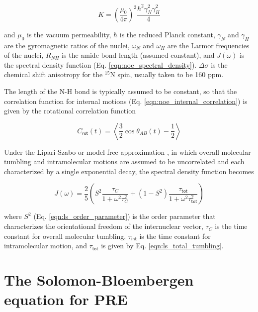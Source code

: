 \documentclass[9pt,review,pubversion]{livecoms}
\begin{document}
\begin{equation}
\label{eqn:spin_relaxation_constant}
K = \left( \frac {\mu_0} {4 \pi} \right)^2 \frac {\hbar^2 \gamma_N^2 \gamma_H^2} {4}
\end{equation}

\noindent and $\mu_0$ is the vacuum permeability, $\hbar$ is the reduced Planck constant, $\gamma_N$ and $\gamma_H$ are the gyromagnetic ratios of the nuclei, $\omega_N$ and $\omega_H$ are the Larmor frequencies of the nuclei, $R_{NH}$ is the amide bond length (assumed constant), and $J(\omega)$ is the spectral density function (Eq. \ref{eqn:noe_spectral_density}).
$\Delta \sigma$ is the chemical shift anisotropy for the $^{15}$N spin, usually taken to be 160 ppm.

The length of the N-H bond is typically assumed to be constant, so that the correlation function for internal motions (Eq. \ref{eqn:noe_internal_correlation}) is given by the rotational correlation function

\begin{equation}
\label{eqn:spin_relaxation_correlation_function}
C_{\mathsf{rot}}(t) = \left \langle \frac {3} {2} \cos \theta_{AB}(t) - \frac {1} {2} \right \rangle
\end{equation}

Under the Lipari-Szabo or model-free approximation \cite{lipari_model-free_1982}, in which overall molecular tumbling and intramolecular motions are assumed to be uncorrelated and each characterized by a single exponential decay, the spectral density function becomes

\begin{equation}
\label{eqn:spin_relaxation_spectral_density}
J(\omega) = \frac {2} {5} \left( S^2 \frac {\tau_C} {1 + \omega^2 \tau_C^2} + \left( 1 - S^2 \right) \frac {\tau_{\mathsf{tot}}} {1 + \omega^2 \tau_{\mathsf{tot}}^2} \right)
\end{equation}

\noindent where $S^2$ (Eq. \ref{eqn:ls_order_parameter}) is the order parameter that characterizes the orientational freedom of the internuclear vector, $\tau_C$ is the time constant for overall molecular tumbling, $\tau_{\mathsf{int}}$ is the time constant for intramolecular motion, and $\tau_{\mathsf{tot}}$ is given by Eq. \ref{eqn:ls_total_tumbling}.

\section{The Solomon-Bloembergen equation for PRE}
\label{app:pre_solomon}
\end{document}
